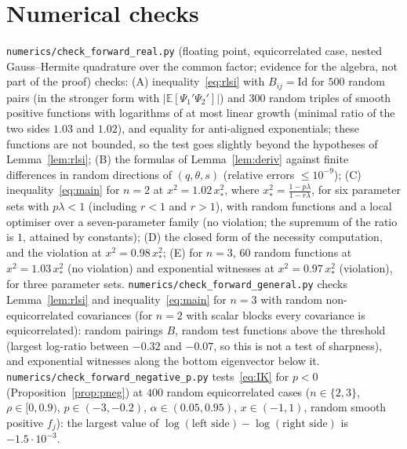 \documentclass[11pt]{amsart}
\theoremstyle{definition}
\newcommand{\E}{\mathbb{E}}
\newcommand{\Id}{\mathrm{Id}}
\begin{document}
\section{Numerical checks}
\texttt{numerics/check\_forward\_real.py} (floating point, equicorrelated case, nested Gauss--Hermite quadrature over
the common factor; evidence for the algebra, not part of the proof) checks:
(A) inequality~\eqref{eq:rlsi} with $B_{ij}=\Id$ for $500$ random pairs (in the stronger form with
$|\E[\Psi_1'\Psi_2']|$) and $300$ random triples of smooth positive functions with logarithms of at most linear
growth (minimal ratio of the two sides $1.03$ and $1.02$), and equality for anti-aligned exponentials; these
functions are not bounded, so the test goes slightly beyond the hypotheses of Lemma~\ref{lem:rlsi};
(B) the formulas of Lemma~\ref{lem:deriv} against finite differences in random directions of $(q,\theta,s)$ (relative
errors $\le10^{-9}$);
(C) inequality~\eqref{eq:main} for $n=2$ at $x^2=1.02\,x_*^2$, where $x_*^2=\frac{1-p\lambda}{1-r\lambda}$, for six
parameter sets with $p\lambda<1$ (including $r<1$ and $r>1$), with random functions and a local optimiser over a
seven-parameter family (no violation; the supremum of the ratio is $1$, attained by constants);
(D) the closed form of the necessity computation, and the violation at $x^2=0.98\,x_*^2$;
(E) for $n=3$, $60$ random functions at $x^2=1.03\,x_*^2$ (no violation) and exponential witnesses at
$x^2=0.97\,x_*^2$ (violation), for three parameter sets.
\texttt{numerics/check\_forward\_general.py} checks Lemma~\ref{lem:rlsi} and inequality~\eqref{eq:main} for $n=3$
with random non-equicorrelated covariances (for $n=2$ with scalar blocks every covariance is equicorrelated): random
pairings $B$, random test functions above the threshold (largest log-ratio between $-0.32$ and $-0.07$, so this is
not a test of sharpness), and exponential witnesses along the bottom eigenvector below it.
\texttt{numerics/check\_forward\_negative\_p.py} tests~\eqref{eq:IK} for $p<0$ (Proposition~\ref{prop:pneg}) at $400$
random equicorrelated cases ($n\in\{2,3\}$, $\rho\in[0,0.9)$, $p\in(-3,-0.2)$, $\alpha\in(0.05,0.95)$, $x\in(-1,1)$,
random smooth positive $f_j$): the largest value of $\log(\text{left side})-\log(\text{right side})$ is
$-1.5\cdot10^{-3}$.
\end{document}
